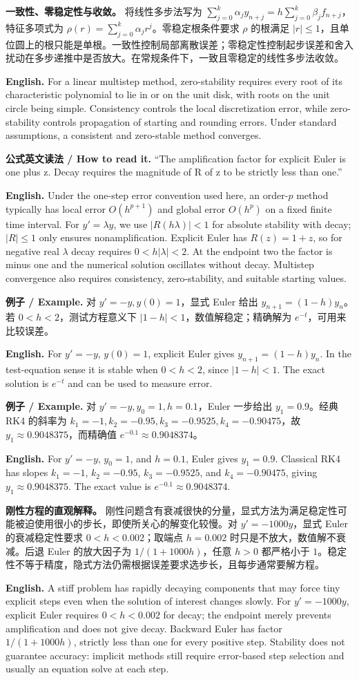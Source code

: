 \documentclass[UTF8,11pt,a4paper]{ctexart}
\newcommand{\EN}[1]{\par\noindent\textbf{English.} #1\par}
\newcommand{\READ}[1]{\par\noindent\textbf{公式英文读法 / How to read it.} #1\par}
\newcommand{\EX}[2]{\par\noindent\textbf{例子 / Example.} #1\par\EN{#2}}
\begin{document}
\noindent\textbf{一致性、零稳定性与收敛。} 将线性多步法写为 $\sum_{j=0}^k\alpha_jy_{n+j}=h\sum_{j=0}^k\beta_jf_{n+j}$，特征多项式为 $\rho(r)=\sum_{j=0}^k\alpha_jr^j$。零稳定根条件要求 $\rho$ 的根满足 $|r|\le1$，且单位圆上的根只能是单根。一致性控制局部离散误差；零稳定性控制起步误差和舍入扰动在多步递推中是否放大。在常规条件下，一致且零稳定的线性多步法收敛。
\EN{For a linear multistep method, zero-stability requires every root of its characteristic polynomial to lie in or on the unit disk, with roots on the unit circle being simple. Consistency controls the local discretization error, while zero-stability controls propagation of starting and rounding errors. Under standard assumptions, a consistent and zero-stable method converges.}
\READ{“The amplification factor for explicit Euler is one plus z. Decay requires the magnitude of R of z to be strictly less than one.”}
\EN{Under the one-step error convention used here, an order-$p$ method typically has local error $O(h^{p+1})$ and global error $O(h^p)$ on a fixed finite time interval. For $y'=\lambda y$, we use $|R(h\lambda)|<1$ for absolute stability with decay; $|R|\le1$ only ensures nonamplification. Explicit Euler has $R(z)=1+z$, so for negative real $\lambda$ decay requires $0<h|\lambda|<2$. At the endpoint two the factor is minus one and the numerical solution oscillates without decay. Multistep convergence also requires consistency, zero-stability, and suitable starting values.}

\EX{对 $y'=-y,y(0)=1$，显式 Euler 给出 $y_{n+1}=(1-h)y_n$。若 $0<h<2$，测试方程意义下 $|1-h|<1$，数值解稳定；精确解为 $e^{-t}$，可用来比较误差。}{For $y'=-y$, $y(0)=1$, explicit Euler gives $y_{n+1}=(1-h)y_n$. In the test-equation sense it is stable when $0<h<2$, since $|1-h|<1$. The exact solution is $e^{-t}$ and can be used to measure error.}

\EX{对 $y'=-y,y_0=1,h=0.1$，Euler 一步给出 $y_1=0.9$。经典 RK4 的斜率为 $k_1=-1,k_2=-0.95,k_3=-0.9525,k_4=-0.90475$，故 $y_1\approx0.9048375$，而精确值 $e^{-0.1}\approx0.9048374$。}{For $y'=-y$, $y_0=1$, and $h=0.1$, Euler gives $y_1=0.9$. Classical RK4 has slopes $k_1=-1$, $k_2=-0.95$, $k_3=-0.9525$, and $k_4=-0.90475$, giving $y_1\approx0.9048375$. The exact value is $e^{-0.1}\approx0.9048374$.}

\noindent\textbf{刚性方程的直观解释。} 刚性问题含有衰减很快的分量，显式方法为满足稳定性可能被迫使用很小的步长，即使所关心的解变化较慢。对 $y'=-1000y$，显式 Euler 的衰减稳定性要求 $0<h<0.002$；取端点 $h=0.002$ 时只是不放大，数值解不衰减。后退 Euler 的放大因子为 $1/(1+1000h)$，任意 $h>0$ 都严格小于 $1$。稳定性不等于精度，隐式方法仍需根据误差要求选步长，且每步通常要解方程。
\EN{A stiff problem has rapidly decaying components that may force tiny explicit steps even when the solution of interest changes slowly. For $y'=-1000y$, explicit Euler requires $0<h<0.002$ for decay; the endpoint merely prevents amplification and does not give decay. Backward Euler has factor $1/(1+1000h)$, strictly less than one for every positive step. Stability does not guarantee accuracy: implicit methods still require error-based step selection and usually an equation solve at each step.}
\end{document}
